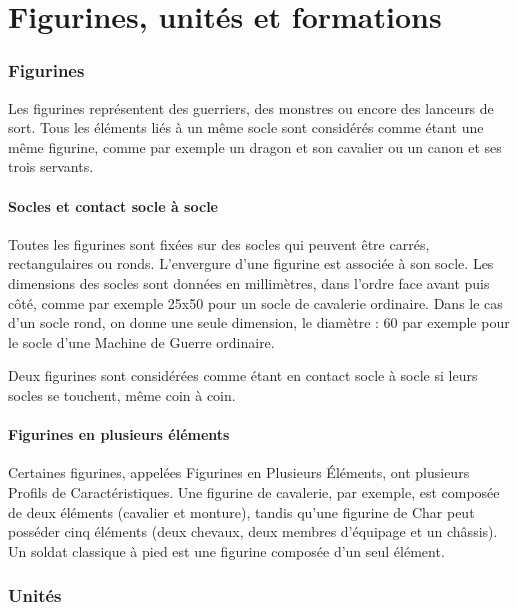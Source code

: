 
\part{Figurines, unités et formations}

\section{Figurines}

Les figurines représentent des guerriers, des monstres ou encore des lanceurs de sort. Tous les éléments liés à un même socle sont considérés comme étant une même figurine, comme par exemple un dragon et son cavalier ou un canon et ses trois servants.

\subsection{Socles et contact socle à socle}

Toutes les figurines sont fixées sur des socles qui peuvent être carrés, rectangulaires ou ronds. L'envergure d'une figurine est associée à son socle. Les dimensions des socles sont données en millimètres, dans l'ordre face avant puis côté, comme par exemple \unit{25x50}{\milli\meter} pour un socle de cavalerie ordinaire. Dans le cas d'un socle rond, on donne une seule dimension, le diamètre : \unit{60}{\milli\meter} par exemple pour le socle d'une Machine de Guerre ordinaire.

Deux figurines sont considérées comme étant en contact socle à socle si leurs socles se touchent, même coin à coin.

\subsection{Figurines en plusieurs éléments}

Certaines figurines, appelées Figurines en Plusieurs Éléments, ont plusieurs Profils de Caractéristiques. Une figurine de cavalerie, par exemple, est composée de deux éléments (cavalier et monture), tandis qu'une figurine de Char peut posséder cinq éléments (deux chevaux, deux membres d'équipage et un châssis). Un soldat classique à pied est une figurine composée d'un seul élément. 

\section{Unités}

